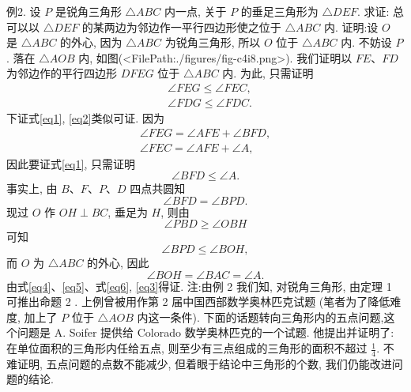 例2. 设 $P$ 是锐角三角形 $\triangle A B C$ 内一点, 关于 $P$ 的垂足三角形为 $\triangle D E F$. 求证: 总可以以 $\triangle D E F$ 的某两边为邻边作一平行四边形使之位于 $\triangle A B C$ 内.
证明:设 $O$ 是 $\triangle A B C$ 的外心, 因为 $\triangle A B C$ 为锐角三角形, 所以 $O$ 位于 $\triangle A B C$ 内.
不妨设 $P$. 落在 $\triangle A O B$ 内, 如图(<FilePath:./figures/fig-c4i8.png>).
我们证明以 $F E 、 F D$ 为邻边作的平行四边形 $D F E G$ 位于 $\triangle A B C$ 内.
为此, 只需证明
$$
\begin{aligned}
& \angle F E G \leqslant \angle F E C, \label{eq1}\\
& \angle F D G \leqslant \angle F D C . \label{eq2}
\end{aligned}
$$
下证式\ref{eq1}, \ref{eq2}类似可证.
因为
$$
\begin{gathered}
\angle F E G=\angle A F E+\angle B F D, \\
\angle F E C=\angle A F E+\angle A,
\end{gathered}
$$
因此要证式\ref{eq1}, 只需证明
$$
\angle B F D \leqslant \angle A . \label{eq3}
$$
事实上, 由 $B 、 F 、 P 、 D$ 四点共圆知
$$
\angle B F D=\angle B P D . \label{eq4}
$$
现过 $O$ 作 $O H \perp B C$, 垂足为 $H$, 则由
$$
\angle P B D \geqslant \angle O B H
$$
可知
$$
\angle B P D \leqslant \angle B O H, \label{eq5}
$$
而 $O$ 为 $\triangle A B C$ 的外心, 因此
$$
\angle B O H=\angle B A C=\angle A . \label{eq6}
$$
由式\ref{eq4}、\ref{eq5}、式\ref{eq6}, \ref{eq3}得证.
注:由例 2 我们知, 对锐角三角形, 由定理 1 可推出命题 2 .
上例曾被用作第 2 届中国西部数学奥林匹克试题 (笔者为了降低难度, 加上了 $P$ 位于 $\triangle A O B$ 内这一条件).
下面的话题转向三角形内的五点问题,这个问题是 A. Soifer 提供给 Colorado 数学奥林匹克的一个试题.
他提出并证明了: 在单位面积的三角形内任给五点, 则至少有三点组成的三角形的面积不超过 $\frac{1}{4}$.
不难证明, 五点问题的点数不能减少, 但着眼于结论中三角形的个数, 我们仍能改进问题的结论.



